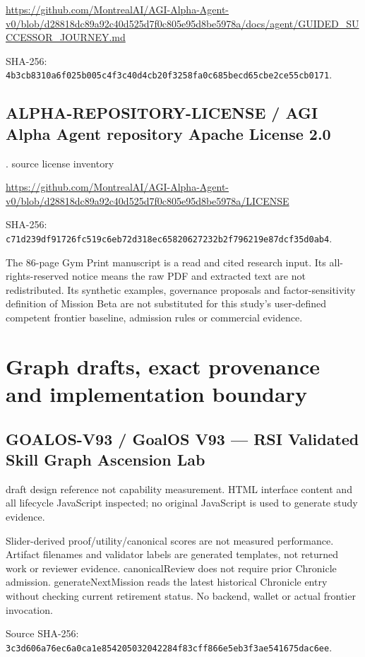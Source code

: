 \documentclass[10pt]{article}
\begin{document}
\url{https://github.com/MontrealAI/AGI-Alpha-Agent-v0/blob/d28818dc89a92c40d525d7f0c805e95d8be5978a/docs/agent/GUIDED_SUCCESSOR_JOURNEY.md}\par SHA-256: \nolinkurl{4b3cb8310a6f025b005c4f3c40d4cb20f3258fa0c685becd65cbe2ce55cb0171}.

\subsection*{ALPHA-REPOSITORY-LICENSE / AGI Alpha Agent repository Apache License 2.0}

.  source license inventory

\url{https://github.com/MontrealAI/AGI-Alpha-Agent-v0/blob/d28818dc89a92c40d525d7f0c805e95d8be5978a/LICENSE}\par SHA-256: \nolinkurl{c71d239df91726fc519c6eb72d318ec65820627232b2f796219e87dcf35d0ab4}.

The 86-page Gym Print manuscript is a read and cited research input. Its all-rights-reserved notice means the raw PDF and extracted text are not redistributed. Its synthetic examples, governance proposals and factor-sensitivity definition of Mission Beta are not substituted for this study's user-defined competent frontier baseline, admission rules or commercial evidence.

\section{Graph drafts, exact provenance and implementation boundary}

\subsection*{GOALOS-V93 / GoalOS V93 --- RSI Validated Skill Graph Ascension Lab}

draft design reference not capability measurement. HTML interface content and all lifecycle JavaScript inspected; no original JavaScript is used to generate study evidence.

Slider-derived proof/utility/canonical scores are not measured performance. Artifact filenames and validator labels are generated templates, not returned work or reviewer evidence. canonicalReview does not require prior Chronicle admission. generateNextMission reads the latest historical Chronicle entry without checking current retirement status. No backend, wallet or actual frontier invocation.

Source SHA-256: \nolinkurl{3c3d606a76ec6a0ca1e854205032042284f83cff866e5eb3f3ae541675dac6ee}.
\end{document}
